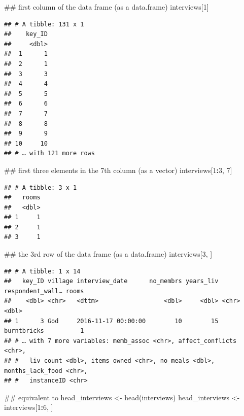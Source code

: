 \documentclass[]{book}
\newenvironment{Shaded}{\begin{snugshade}}{\end{snugshade}}
\newcommand{\DecValTok}[1]{\textcolor[rgb]{0.00,0.00,0.81}{#1}}
\newcommand{\StringTok}[1]{\textcolor[rgb]{0.31,0.60,0.02}{#1}}
\newcommand{\OperatorTok}[1]{\textcolor[rgb]{0.81,0.36,0.00}{\textbf{#1}}}
\newcommand{\NormalTok}[1]{#1}
\begin{document}
\begin{Shaded}
\begin{Highlighting}[]
\NormalTok{## first column of the data frame (as a data.frame)}
\NormalTok{interviews[}\DecValTok{1}\NormalTok{]}
\end{Highlighting}
\end{Shaded}

\begin{verbatim}
## # A tibble: 131 x 1
##    key_ID
##     <dbl>
##  1      1
##  2      1
##  3      3
##  4      4
##  5      5
##  6      6
##  7      7
##  8      8
##  9      9
## 10     10
## # … with 121 more rows
\end{verbatim}

\begin{Shaded}
\begin{Highlighting}[]
\NormalTok{## first three elements in the 7th column (as a vector)}
\NormalTok{interviews[}\DecValTok{1}\OperatorTok{:}\DecValTok{3}\NormalTok{, }\DecValTok{7}\NormalTok{]}
\end{Highlighting}
\end{Shaded}

\begin{verbatim}
## # A tibble: 3 x 1
##   rooms
##   <dbl>
## 1     1
## 2     1
## 3     1
\end{verbatim}

\begin{Shaded}
\begin{Highlighting}[]
\NormalTok{## the 3rd row of the data frame (as a data.frame)}
\NormalTok{interviews[}\DecValTok{3}\NormalTok{, ]}
\end{Highlighting}
\end{Shaded}

\begin{verbatim}
## # A tibble: 1 x 14
##   key_ID village interview_date      no_membrs years_liv respondent_wall… rooms
##    <dbl> <chr>   <dttm>                  <dbl>     <dbl> <chr>            <dbl>
## 1      3 God     2016-11-17 00:00:00        10        15 burntbricks          1
## # … with 7 more variables: memb_assoc <chr>, affect_conflicts <chr>,
## #   liv_count <dbl>, items_owned <chr>, no_meals <dbl>, months_lack_food <chr>,
## #   instanceID <chr>
\end{verbatim}

\begin{Shaded}
\begin{Highlighting}[]
\NormalTok{## equivalent to head_interviews <- head(interviews)}
\NormalTok{head_interviews <-}\StringTok{ }\NormalTok{interviews[}\DecValTok{1}\OperatorTok{:}\DecValTok{6}\NormalTok{, ]}
\end{Highlighting}
\end{Shaded}
\end{document}
